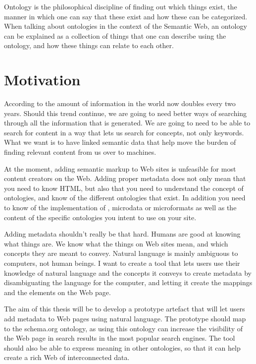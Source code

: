 Ontology is the philosophical discipline of finding out which things exist,
the manner in which one can say that these exist and how these can be categorized.
When talking about ontologies in the context of the Semantic Web,
an ontology can be explained as a collection of things that one can describe using the ontology,
and how these things can relate to each other.


\section{Motivation}
According to \citet{Gantz2011} the amount of information in the world now doubles every two years.
Should this trend continue, we are going to need better ways of searching through all the information that is generated.
We are going to need to be able to search for content in a way that lets us search for concepts, not only keywords.
What we want is to have linked semantic data that help move the burden of finding relevant content from us over to machines.

At the moment, adding semantic markup to Web sites is unfeasible for most content creators on the Web.
Adding proper metadata does not only mean that you need to know HTML,
but also that you need to understand the concept of ontologies, and know of the different ontologies that exist.
In addition you need to know of the implementation of , microdata or microformats
as well as the content of the specific ontologies you intent to use on your site.

Adding metadata shouldn't really be that hard.
Humans are good at knowing what things are.
We know what the things on Web sites mean, and which concepts they are meant to convey.
Natural language is mainly ambiguous to computers, not human beings.
I want to create a tool that lets users use their knowledge of natural language and the concepts it conveys
to create metadata by disambiguating the language for the computer, and letting it create the mappings and the elements on the Web page.

The aim of this thesis will be to develop a prototype artefact that will let users add metadata to Web pages using natural language.
The prototype should map to the schema.org ontology,
as using this ontology can increase the visibility of the Web page in search results in the most popular search engines.
The tool should also be able to express meaning in other ontologies, so that it can help create a rich Web of interconnected data.

